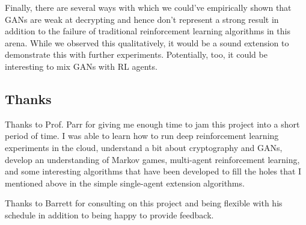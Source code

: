 \documentclass{llncs}
\begin{document}
Finally, there are several ways with which we could've empirically shown that GANs are weak at decrypting and hence don't represent a strong result in addition to the failure of traditional reinforcement learning algorithms in this arena. While we observed this qualitatively, it would be a sound extension to demonstrate this with further experiments. Potentially, too, it could be interesting to mix GANs with RL agents. 
\subsection{Thanks}

Thanks to Prof. Parr for giving me enough time to jam this project into a short period of time. I was able to learn how to run deep reinforcement learning experiments in the cloud, understand a bit about cryptography and GANs, develop an understanding of Markov games, multi-agent reinforcement learning, and some interesting algorithms that have been developed to fill the holes that I mentioned above in the simple single-agent extension algorithms. 

Thanks to Barrett for consulting on this project and being flexible with his schedule in addition to being happy to provide feedback. 



\nocite{*}

%
%
%
\end{document}
